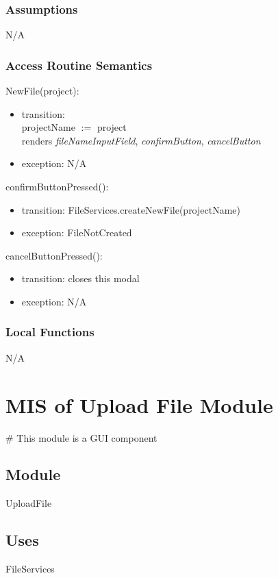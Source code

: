 \documentclass[12pt, titlepage]{article}
\begin{document}
	\subsubsection{Assumptions}
	N/A
	
	\subsubsection{Access Routine Semantics}
	
	\noindent NewFile(project):
	\begin{itemize}
		\item transition:\\
		projectName $:=$ project \\
		renders \textit{fileNameInputField}, \textit{confirmButton}, \textit{cancelButton}
		\item exception: N/A
	\end{itemize}
	
	\noindent confirmButtonPressed():
	\begin{itemize}
		\item transition: FileServices.createNewFile(projectName)\\
		\item exception: FileNotCreated
	\end{itemize}
	
	\noindent cancelButtonPressed():
	\begin{itemize}
		\item transition: closes this modal
		\item exception: N/A
	\end{itemize}
	
	\subsubsection{Local Functions}
	
	N/A
	
	\newpage
	
	\section{MIS of Upload File Module} \label{Module} 
	\# This module is a GUI component
	\subsection{Module}
	
	UploadFile
	
	\subsection{Uses}
	FileServices
	
\end{document}

